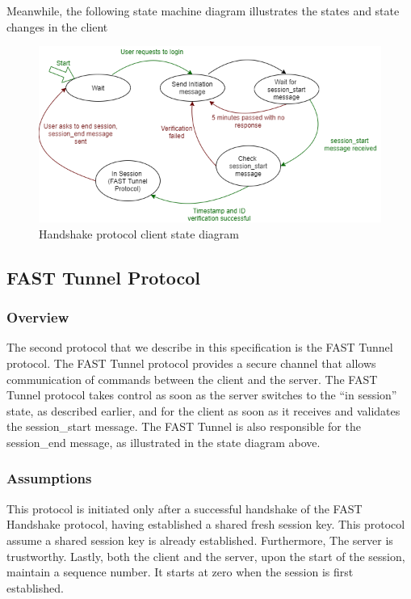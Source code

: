 \documentclass[12pt]{article}
\begin{document}
\noindent Meanwhile, the following state machine diagram illustrates the states and state changes in the client

\begin{figure}[h]
    \centering
    \includegraphics[width=\textwidth]{Handshake_State_Diagram_Client}
    \caption{Handshake protocol client state diagram}
    \label{fig:handshake_state_client}
\end{figure}

\subsection{FAST Tunnel Protocol}

\subsubsection{Overview}

The second protocol that we describe in this specification is the FAST Tunnel protocol. The FAST Tunnel protocol provides a secure channel that allows communication of commands between the client and the server. The FAST Tunnel protocol takes control as soon as the server switches to the “in session” state, as described earlier, and for the client as soon as it receives and validates the session\_start message. The FAST Tunnel is also responsible for the session\_end message, as illustrated in the state diagram above.

\subsubsection{Assumptions}

This protocol is initiated only after a successful handshake of the FAST Handshake protocol, having established a shared fresh session key. This protocol assume a shared session key is already established. Furthermore, The server is trustworthy. Lastly, both the client and the server, upon the start of the session, maintain a sequence number. It starts at zero when the session is first established.
\end{document}
